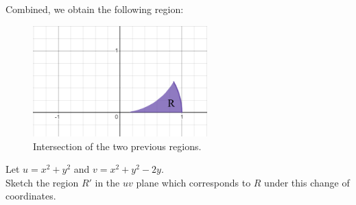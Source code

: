 \begin{solution}
    \newpage
    Combined, we obtain the following region:
    \begin{figure}[h!]
        \centering
        \includegraphics[width=0.6\textwidth]{Pictures/Tutorial 6-3.png}
        \caption{Intersection of the two previous regions.}
    \end{figure}
\end{solution}

\begin{tcolorbox}[
        title={Problem 36 (b)},
        valign=center,
        nobeforeafter,
        colframe=gray!95!black
    ]
    Let \(u = x^2 + y^2\) and \(v = x^2 + y^2 - 2y\). \\
    
    Sketch the region \(R'\) in the \(uv\) plane which corresponds to \(R\) under this change of coordinates.
\end{tcolorbox}

